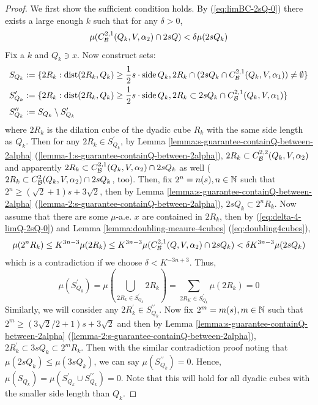 \begin{proof}
    We first show the sufficient condition holds. By (\ref{eq:limBC-2sQ-0}) there exists a large enough $k$ such that for any $\delta>0$,
    {\color{red}
    \begin{equation}\label{eq:delta-4-limQ-2sQ-0}
        \mu(C_\mathcal B^{2,1}(Q_k, V, \alpha_2)\cap 2sQ) < \delta\mu(2sQ_k)
    \end{equation}
    }
    Fix a $k$ and $Q_k\ni x$. Now construct sets:
    {\color{red}
    \begin{equation*}
        \begin{split}
            S_{Q_k} &:= \{2R_k: \operatorname{dist}(2R_k, Q_k)\geq \frac{1}{2}s\cdot\operatorname{side} Q_k, 2R_k\cap(2sQ_k\cap C_\mathcal B^{2, 1} (Q_k, V, \alpha_1))\neq \emptyset\} \\
            S_{Q_k}^\prime &:= \{2R_k: \operatorname{dist}(2R_k, Q_k)\geq \frac{1}{2}s\cdot\operatorname{side} Q_k, 2R_k\subset 2sQ_k\cap C_\mathcal B^{2, 1} (Q_k, V, \alpha_1)\} \\
            S_{Q_k}^{\prime\prime} &:= S_{Q_k} \setminus S_{Q_k}^\prime
        \end{split}
    \end{equation*}
    }
    where $2R_k$ is the dilation cube of the dyadic cube $R_k$ with the same side length as $Q_k$. Then for any $2R_k\in S_{Q_k}^\prime$, by Lemma \ref{lemma:s-guarantee-containQ-between-2alpha} (\ref{lemma-1:s-guarantee-containQ-between-2alpha}), $2R_k\subset  C_\mathcal B^{2,2}(Q_k, V, \alpha_2)$ and apparently $2R_k\subset  C_\mathcal B^{2,1}(Q_k, V, \alpha_2)\cap 2sQ_k$ as well{\color{red} ($2R_k\subset  C_\mathcal B^{2}(Q_k, V, \alpha_2)\cap 2sQ_k$, too)}. Then, fix $2^n=n(s), n\in\mathbb{N}$ such that $2^n\geq (\sqrt{2}+1)s + 3\sqrt{2}$, then by Lemma \ref{lemma:s-guarantee-containQ-between-2alpha} (\ref{lemma-2:s-guarantee-containQ-between-2alpha}), $2sQ_k\subset 2^n R_k$. Now assume that there are some $\mu$-a.e. $x$ are contained in $2R_k$, then by (\ref{eq:delta-4-limQ-2sQ-0}) and Lemma \ref{lemma:doubling-meaure-4cubes} (\ref{eq:doubling4cubes}), 
    \begin{equation*}
        \mu(2^n R_k)\leq K^{3n-3}\mu(2R_k)\leq K^{3n-3}\mu(C_\mathcal B^{2,1}(Q, V, \alpha_2)\cap 2sQ_k) < \delta K^{3n-3} \mu(2sQ_k)
    \end{equation*}
    which is a contradiction if we choose $\delta<K^{-3n+3}$. Thus, 
    \begin{equation*}
        \mu(S_{Q_k}^\prime) = \mu(\bigcup_{2R_k\in S_{Q_k}^\prime} 2R_k)=\sum_{2R_K \in S^\prime_{Q_k}}\mu(2R_k)=0
    \end{equation*}
    Similarly, we will consider any $2R_k^\prime\in S^{\prime\prime}_{Q_k}$. Now fix $2^m = m(s), m\in\mathbb{N}$ such that $2^m \geq (3\sqrt{2}/2+1)s + 3\sqrt{2}$ and then by Lemma \ref{lemma:s-guarantee-containQ-between-2alpha} (\ref{lemma-2:s-guarantee-containQ-between-2alpha}), $2R_k^\prime \subset  3sQ_k \subset 2^m R_k$. Then with the similar contradiction proof noting that $\mu(2sQ_k)\leq \mu(3sQ_k)$, we can say $\mu(S_{Q_k}^{\prime\prime})=0$. Hence, $\mu(S_{Q_k}) = \mu(S_{Q_k}^\prime \cup S_{Q_k}^{\prime\prime}) = 0$. {\color{red}Note that this will hold for all dyadic cubes with the smaller side length than $Q_k$.}
    

\end{proof}
